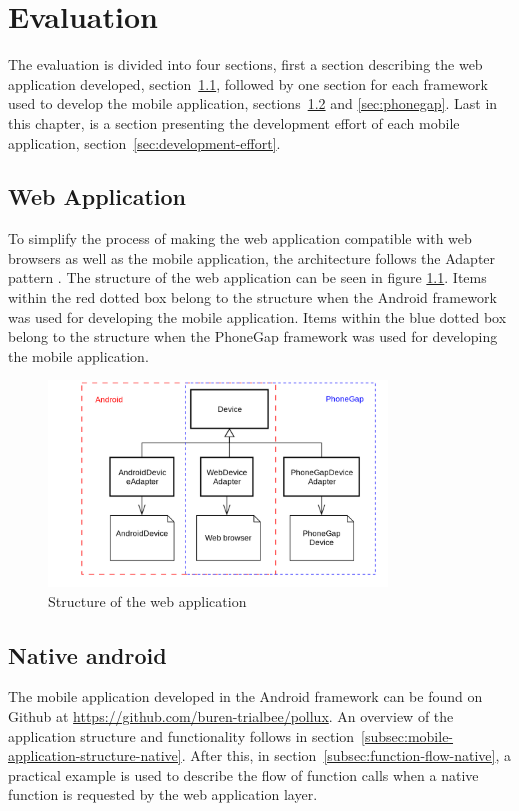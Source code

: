 \chapter{Evaluation}	\label{ch:evaluation}
The evaluation is divided into four sections, first a section describing the web application developed, section~\ref{sec:web-application}, followed by one section for each framework used to develop the mobile application, sections~\ref{sec:native-android} and \ref{sec:phonegap}. Last in this chapter, is a section presenting the development effort of each mobile application, section~\ref{sec:development-effort}.

\section{Web Application}\label{sec:web-application}
To simplify the process of making the web application compatible with web browsers as well as the mobile application, the architecture follows the Adapter pattern \cite[p.~317]{martin2003}. The structure of the web application can be seen in figure \ref{fig:webuml}. Items within the red dotted box belong to the structure when the Android framework was used for developing the mobile application. Items within the blue dotted box belong to the structure when the PhoneGap framework was used for developing the mobile application.

\begin{figure}[h!]
	\centering
    \includegraphics[width=90mm,natwidth=600,natheight=450]{./img/webuml.png}
    \caption{Structure of the web application}
	\label{fig:webuml}
\end{figure}

\section{Native android} \label{sec:native-android}
The mobile application developed in the Android framework can be found on Github at \url{https://github.com/buren-trialbee/pollux}. An overview of the application structure and functionality follows in section~\ref{subsec:mobile-application-structure-native}. After this, in section~\ref{subsec:function-flow-native}, a practical example is used to describe the flow of function calls when a native function is requested by the web application layer.

